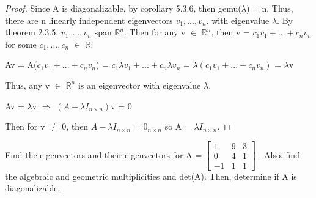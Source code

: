     \begin{proof}
        Since A is diagonalizable, by {\color{orange} corollary 5.3.6},
        then gemu($\lambda$) = n.
        Thus, there are n linearly independent eigenvectors $v_1,...,v_n$.
        with eigenvalue $\lambda$. By {\color{red} theorem 2.3.5},
        $v_1,...,v_n$ span $\mathbb{R}^n$.
        Then for any v $\in$ $\mathbb{R}^n$, then
        v = $c_1v_1 + ... + c_nv_n$ for some $c_1,...,c_n$ $\in$ $\mathbb{R}$:

        \hspace{0.5cm}
        Av
        = A($c_1v_1 + ... + c_nv_n$)
        = $c_1\lambda v_1 + ... + c_n\lambda v_n$
        = $\lambda(c_1v_1 + ... + c_nv_n)$
        = $\lambda$v

        Thus, any v $\in$ $\mathbb{R}^n$ is an eigenvector with
        eigenvalue $\lambda$.

        \hspace{0.5cm}
        Av = $\lambda$v
        \hspace{1cm}
        $\Rightarrow$
        \hspace{1cm}
        $(A - \lambda I_{n \times n})$v = 0

        Then for v $\not =$ 0, then
        $A - \lambda I_{n \times n}$ = $0_{n \times n}$
        so A = $\lambda I_{n \times n}$.
    \end{proof}

    \vspace{0.5cm}



    \begin{example}
        Find the eigenvectors and their eigenvectors for
        A =
        \scriptsize
        $\begin{bmatrix}
            1 & 9 & 3 \\
            0 & 4 & 1 \\
            -1 & 1 & 1
        \end{bmatrix}$
        \normalsize.
        Also, find the algebraic and geometric multiplicities and det(A).
        Then, determine if A is diagonalizable.
    \end{example}

